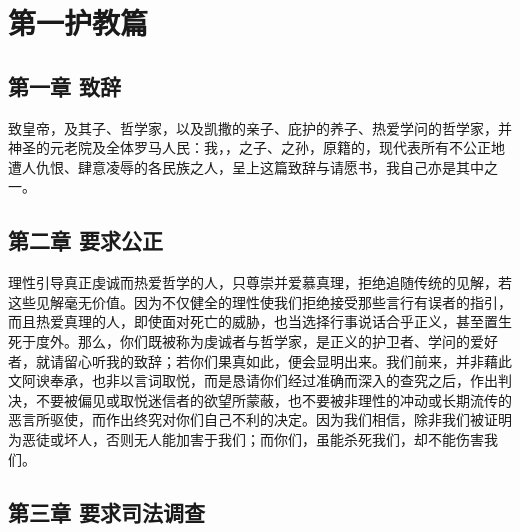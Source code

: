 
\chapter{第一护教篇}



\section{第一章 致辞}

致皇帝，及其子、哲学家，以及凯撒的亲子、庇护的养子、热爱学问的哲学家，并神圣的元老院及全体罗马人民：我，，之子、之孙，原籍的，现代表所有不公正地遭人仇恨、肆意凌辱的各民族之人，呈上这篇致辞与请愿书，我自己亦是其中之一。\par


\section{第二章 要求公正}

理性引导真正虔诚而热爱哲学的人，只尊崇并爱慕真理，拒绝追随传统的见解，若这些见解毫无价值。因为不仅健全的理性使我们拒绝接受那些言行有误者的指引，而且热爱真理的人，即使面对死亡的威胁，也当选择行事说话合乎正义，甚至置生死于度外。那么，你们既被称为虔诚者与哲学家，是正义的护卫者、学问的爱好者，就请留心听我的致辞；若你们果真如此，便会显明出来。我们前来，并非藉此文阿谀奉承，也非以言词取悦，而是恳请你们经过准确而深入的查究之后，作出判决，不要被偏见或取悦迷信者的欲望所蒙蔽，也不要被非理性的冲动或长期流传的恶言所驱使，而作出终究对你们自己不利的决定。因为我们相信，除非我们被证明为恶徒或坏人，否则无人能加害于我们；而你们，虽能杀死我们，却不能伤害我们。\par


\section{第三章 要求司法调查}

